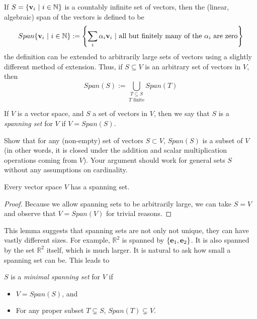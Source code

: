 \documentclass{ximera}
\begin{document}
\begin{remark} If $S = \{{\bf v}_i\ |\ i\in\mathbb N\}$ is a countably infinite set of vectors, then the (linear, algebraic) span of the vectors is defined to be
\[
Span\{{\bf v}_i\ |\ i\in\mathbb N\} := \left\{\sum_i\alpha_i{\bf v}_i\ |\ \text{all but finitely many of the }\alpha_i\text{ are zero}\right\}
\]
the definition can be extended to arbitrarily large sets of vectors using a slightly different method of extension. Thus, if $S\subseteq V$ is an arbitrary set of vectors in $V$, then
\[
Span(S) := \underset{T\text{ finite}}{\underset{T\subseteq S}{\bigcup}} Span(T)
\]
\end{remark}

\begin{definition} If $V$ is a vector space, and $S$ a set of vectors in $V$, then we say that $S$ is a {\it spanning set} for $V$ if $V = Span(S)$.
\end{definition}

\begin{exercise} Show that for any (non-empty) set of vectors $S\subset V$, $Span(S)$ is a subset of $V$ (in other words, it is closed under the addition and scalar multiplication operations coming from $V$). Your argument should work for general sets $S$ without any assumptions on cardinality.
\end{exercise}

\begin{lemma} Every vector space $V$ has a spanning set.
\end{lemma}

\begin{proof} Because we allow spanning sets to be arbitrarily large, we can take $S = V$ and observe that $V = Span(V)$ for trivial reasons.
\end{proof}

This lemma suggests that spanning sets are not only not unique, they can have vastly different sizes. For example, $\mathbb R^2$ is spanned by $\{{\bf e}_1, {\bf e}_2\}$. It is also spanned by the set $\mathbb R^2$ itself, which is much larger. It is natural to ask how small a spanning set can be. This leads to

\begin{definition} $S$ is a {\it minimal spanning set} for $V$ if
\begin{itemize} 
\item $V = Span(S)$, and
\item For any proper subset $T\subsetneq S$, $Span(T)\subsetneq V$.
\end{itemize}
\end{definition}
\end{document}
